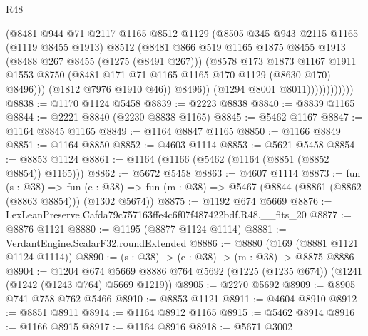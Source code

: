 \begin{lexlean}{R48}
\begin{coremodule}
                            (@8481
                              @944
                              @71
                              @2117
                              @1165
                              @8512
                              @1129
                              (@8505
                                @345
                                @943
                                @2115
                                @1165
                                (@1119 @8455 @1913)
                                @8512
                                (@8481
                                  @866
                                  @519
                                  @1165
                                  @1875
                                  @8455
                                  @1913
                                  (@8488 @267 @8455 (@1275 (@8491 @267)))
                                  (@8578
                                    @173
                                    @1873
                                    @1167
                                    @1911
                                    @1553
                                    @8750
                                    (@8481 @171 @71 @1165 @1165 @170 @1129 (@8630 @170) @8496)))
                                (@1812 @7976 @1910 @46))
                              @8496))
                          (@1294 @8001 @8011))))))))))))
@8838 := @1170 @1124 @5458
@8839 := @2223 @8838
@8840 := @8839 @1165
@8844 := @2221 @8840 (@2230 @8838 @1165)
@8845 := @5462 @1167
@8847 := @1164 @8845 @1165
@8849 := @1164 @8847 @1165
@8850 := @1166 @8849
@8851 := @1164 @8850
@8852 := @4603 @1114
@8853 := @5621 @5458
@8854 := @8853 @1124
@8861 := @1164 (@1166 (@5462 (@1164 (@8851 (@8852 @8854)) @1165)))
@8862 := @5672 @5458
@8863 := @4607 @1114
@8873 := fun (s : @38) =>
  fun (e : @38) => fun (m : @38) => @5467 (@8844 (@8861 (@8862 (@8863 @8854))) (@1302 @5674))
@8875 := @1192 @674 @5669
@8876 := LexLeanPreserve.Cafda79c757163ffe4c6f07f487422bdf.R48.__fits_20
@8877 := @8876 @1121
@8880 := @1195 (@8877 @1124 @1114)
@8881 := VerdantEngine.ScalarF32.roundExtended
@8886 := @8880 (@169 (@8881 @1121 @1124 @1114))
@8890 := (s : @38) -> (e : @38) -> (m : @38) -> @8875 @8886
@8904 := @1204
    @674
    @5669
    @8886
    @764
    @5692
    (@1225 (@1235 @674))
    (@1241 (@1242 (@1243 @764) @5669 @1219))
@8905 := @2270 @5692
@8909 := @8905 @741 @758 @762 @5466
@8910 := @8853 @1121
@8911 := @4604 @8910
@8912 := @8851 @8911
@8914 := @1164 @8912 @1165
@8915 := @5462 @8914
@8916 := @1166 @8915
@8917 := @1164 @8916
@8918 := @5671 @3002

\end{coremodule}
\end{lexlean}
